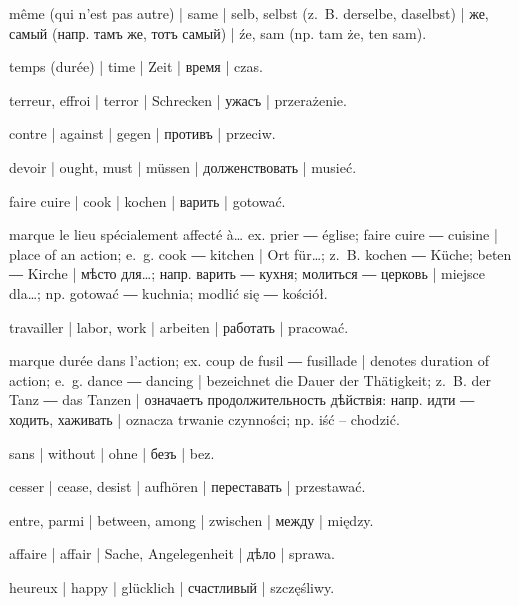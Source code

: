 \begin{ekzvocab}{1em}
 même (qui n’est pas autre) | same | selb, selbst (z.~B. derselbe, daselbst) | же, самый (напр. тамъ же, тотъ самый) | źe, sam (np. tam że, ten sam).

 temps (durée) | time | Zeit | время | czas.

 terreur, effroi | terror | Schrecken | ужасъ | przerażenie.

 contre | against | gegen | противъ | przeciw.

 devoir | ought, must | müssen | долженствовать | musieć.

 faire cuire | cook | kochen | варить | gotować.

 marque le lieu spécialement affecté à\ldots{} ex.  prier ―  église;  faire cuire ―  cuisine | place of an action; e.~g.  cook ―  kitchen | Ort für\ldots{}; z.~B.  kochen ―  Küche;  beten ―  Kirche | мѣсто для\ldots{}; напр.  варить ―  кухня;  молиться ―  церковь | miejsce dla\ldots{}; np.  gotować ―  kuchnia;  modlić się ―  kościół.

 travailler | labor, work | arbeiten | работать | pracować.

 marque durée dans l’action; ex.  coup de fusil ―  fusillade | denotes duration of action; e.~g.  dance ―  dancing | bezeichnet die Dauer der Thätigkeit; z.~B.  der Tanz ―  das Tanzen | означаетъ продолжительность дѣйствія: напр.  идти ―  ходить, хаживать | oznacza trwanie czynności; np.  iść --  chodzić.

 sans | without | ohne | безъ | bez.

 cesser | cease, desist | aufhören | переставать | przestawać.

 entre, parmi | between, among | zwischen | между | między.

 affaire | affair | Sache, Angelegenheit | дѣло | sprawa.

 heureux | happy | glücklich | счастливый | szczęśliwy.


\end{ekzvocab}
